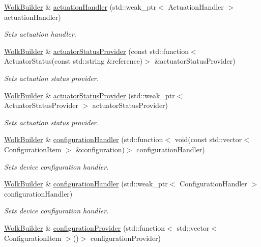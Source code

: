 \begin{DoxyCompactItemize}
\hyperlink{classwolkabout_1_1_wolk_builder}{Wolk\+Builder} \& \hyperlink{classwolkabout_1_1_wolk_builder_a0680cbb1e0cd4c12841be304d9faa869}{actuation\+Handler} (std\+::weak\+\_\+ptr$<$ Actuation\+Handler $>$ actuation\+Handler)
\begin{DoxyCompactList}\small\item\em Sets actuation handler. \end{DoxyCompactList}\item 
\hyperlink{classwolkabout_1_1_wolk_builder}{Wolk\+Builder} \& \hyperlink{classwolkabout_1_1_wolk_builder_ad85a6b424fc553e0fd044b0e8f61d95d}{actuator\+Status\+Provider} (const std\+::function$<$ Actuator\+Status(const std\+::string \&reference)$>$ \&actuator\+Status\+Provider)
\begin{DoxyCompactList}\small\item\em Sets actuation status provider. \end{DoxyCompactList}\item 
\hyperlink{classwolkabout_1_1_wolk_builder}{Wolk\+Builder} \& \hyperlink{classwolkabout_1_1_wolk_builder_aa6884d08e743c7f2d0a173aa2a0cf529}{actuator\+Status\+Provider} (std\+::weak\+\_\+ptr$<$ Actuator\+Status\+Provider $>$ actuator\+Status\+Provider)
\begin{DoxyCompactList}\small\item\em Sets actuation status provider. \end{DoxyCompactList}\item 
\hyperlink{classwolkabout_1_1_wolk_builder}{Wolk\+Builder} \& \hyperlink{classwolkabout_1_1_wolk_builder_a70278ae29af4f3be9f903394491ddd3c}{configuration\+Handler} (std\+::function$<$ void(const std\+::vector$<$ Configuration\+Item $>$ \&configuration)$>$ configuration\+Handler)
\begin{DoxyCompactList}\small\item\em Sets device configuration handler. \end{DoxyCompactList}\item 
\hyperlink{classwolkabout_1_1_wolk_builder}{Wolk\+Builder} \& \hyperlink{classwolkabout_1_1_wolk_builder_ad3862b32ac54bbd90958a4be94ef301a}{configuration\+Handler} (std\+::weak\+\_\+ptr$<$ Configuration\+Handler $>$ configuration\+Handler)
\begin{DoxyCompactList}\small\item\em Sets device configuration handler. \end{DoxyCompactList}\item 
\hyperlink{classwolkabout_1_1_wolk_builder}{Wolk\+Builder} \& \hyperlink{classwolkabout_1_1_wolk_builder_ab8935ff2f79d2d16e4fb2d34a5e7f7c2}{configuration\+Provider} (std\+::function$<$ std\+::vector$<$ Configuration\+Item $>$()$>$ configuration\+Provider)

\end{DoxyCompactItemize}
